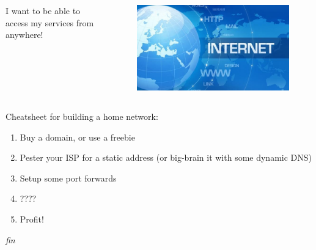 \documentclass{beamer}
\begin{document}
\begin{frame}
    \begin{columns}
        \begin{column}{0.5\textwidth}
            I want to be able to access my services from anywhere!
        \end{column}
        \begin{column}{0.5\textwidth}
            \begin{figure}
                \centering
                \includegraphics[width=\textwidth]{../resources/internet.jpg}
            \end{figure}
        \end{column}
    \end{columns}
\end{frame}

\begin{frame}
    \begin{center}
        Cheatsheet for building a home network:
    \end{center}
    \begin{enumerate}
        \item Buy a domain, or use a freebie
        \item Pester your ISP for a static address (or big-brain it with some dynamic DNS)
        \item Setup some port forwards
        \item ????
        \item Profit!
    \end{enumerate}
\end{frame}


\begin{frame}
    \begin{center}
        \textit{fin}
    \end{center}
\end{frame}
\end{document}
